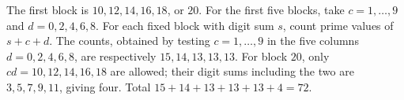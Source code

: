 The first block is $10,12,14,16,18$, or $20$. For the first five blocks, take $c=1,\ldots,9$ and $d=0,2,4,6,8$. For each fixed block with digit sum $s$, count prime values of $s+c+d$. The counts, obtained by testing $c=1,\ldots,9$ in the five columns $d=0,2,4,6,8$, are respectively $15,14,13,13,13$. For block $20$, only $cd=10,12,14,16,18$ are allowed; their digit sums including the two are $3,5,7,9,11$, giving four. Total $15+14+13+13+13+4=\boxed{72}$.
